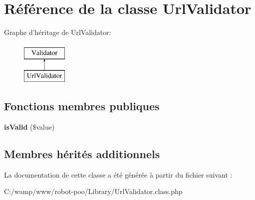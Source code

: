 \hypertarget{class_library_1_1_url_validator}{\section{Référence de la classe Url\+Validator}
\label{class_library_1_1_url_validator}
}
Graphe d'héritage de Url\+Validator\+:\begin{figure}[H]
\begin{center}
\leavevmode
\includegraphics[height=2.000000cm]{class_library_1_1_url_validator}
\end{center}
\end{figure}
\subsection*{Fonctions membres publiques}
\begin{DoxyCompactItemize}
\item 
\hypertarget{class_library_1_1_url_validator_a72063d2e922edda5321b1970297eb0c3}{{\bfseries is\+Valid} (\$value)}\label{class_library_1_1_url_validator_a72063d2e922edda5321b1970297eb0c3}

\end{DoxyCompactItemize}
\subsection*{Membres hérités additionnels}


La documentation de cette classe a été générée à partir du fichier suivant \+:\begin{DoxyCompactItemize}
\item 
C\+:/wamp/www/robot-\/poo/\+Library/Url\+Validator.\+class.\+php\end{DoxyCompactItemize}
